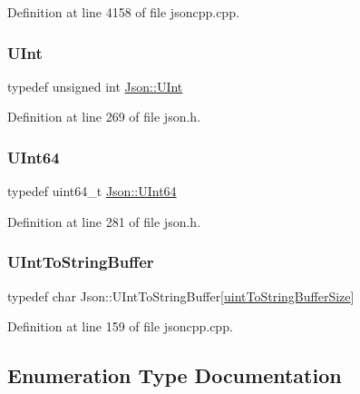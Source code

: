 Definition at line 4158 of file jsoncpp.\+cpp.

\mbox{\label{namespace_json_a800fb90eb6ee8d5d62b600c06f87f7d4}} 
\subsubsection{\texorpdfstring{U\+Int}{UInt}}
{\footnotesize\ttfamily typedef unsigned int \hyperlink{namespace_json_a800fb90eb6ee8d5d62b600c06f87f7d4}{Json\+::\+U\+Int}}



Definition at line 269 of file json.\+h.

\mbox{\label{namespace_json_adf3fa5cb60c619e4f02315ad355e0ca1}} 
\subsubsection{\texorpdfstring{U\+Int64}{UInt64}}
{\footnotesize\ttfamily typedef uint64\+\_\+t \hyperlink{namespace_json_adf3fa5cb60c619e4f02315ad355e0ca1}{Json\+::\+U\+Int64}}



Definition at line 281 of file json.\+h.

\mbox{\label{namespace_json_a602bcf69c2042fb61c3b243cb16f04ca}} 
\subsubsection{\texorpdfstring{U\+Int\+To\+String\+Buffer}{UIntToStringBuffer}}
{\footnotesize\ttfamily typedef char Json\+::\+U\+Int\+To\+String\+Buffer\mbox{[}\hyperlink{namespace_json_a2aacab54ef6fc18e833fbd4982a0a23aae4f2008c7919f20d81286121d1374424}{uint\+To\+String\+Buffer\+Size}\mbox{]}}



Definition at line 159 of file jsoncpp.\+cpp.



\subsection{Enumeration Type Documentation}
\mbox{\label{namespace_json_a2aacab54ef6fc18e833fbd4982a0a23a}} 
